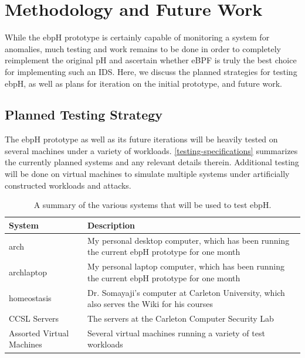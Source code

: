 \documentclass[
  12pt]{findlay}
\begin{document}
\hypertarget{methodology-and-future-work}{%
\section{Methodology and Future
Work}\label{methodology-and-future-work}}

While the ebpH prototype is certainly capable of monitoring a system for
anomalies, much testing and work remains to be done in order to
completely reimplement the original pH and ascertain whether eBPF is
truly the best choice for implementing such an IDS. Here, we discuss the
planned strategies for testing ebpH, as well as plans for iteration on
the initial prototype, and future work.

\hypertarget{planned-testing-strategy}{%
\subsection{Planned Testing Strategy}\label{planned-testing-strategy}}

The ebpH prototype as well as its future iterations will be heavily
tested on several machines under a variety of workloads.
\autoref{testing-specifications} summarizes the currently planned
systems and any relevant details therein. Additional testing will be
done on virtual machines to simulate multiple systems under artificially
constructed workloads and attacks.

\begin{table}
\caption[A summary of the various systems that will be used to test ebpH]
{
A summary of the various systems that will be used to test ebpH.
}
\label{testing-specifications}
\begin{center}
\begin{tabular}{|l|p{4in}|}
\hline
\textbf{System} & \textbf{Description}\\
\hline
\hline
arch & My personal desktop computer, which has been running the current ebpH prototype for one month\\
\hline
archlaptop & My personal laptop computer, which has been running the current ebpH prototype for one month\\
\hline
homeostasis & Dr. Somayaji's computer at Carleton University, which also serves the Wiki for his courses\\
\hline
CCSL Servers & The servers at the Carleton Computer Security Lab\\
\hline
Assorted Virtual Machines & Several virtual machines running a variety of test workloads\\
\hline
\end{tabular}
\end{center}
\end{table}
\end{document}

